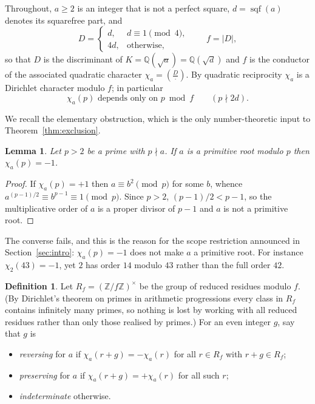 \documentclass[11pt,reqno]{amsart}
\theoremstyle{plain}
\newtheorem{lemma}[theorem]{Lemma}
\theoremstyle{definition}
\newtheorem{definition}[theorem]{Definition}
\DeclareMathOperator{\sqf}{sqf}
\newcommand{\Leg}[2]{\left(\frac{#1}{#2}\right)}
\newcommand{\Z}{\mathbb{Z}}
\newcommand{\Q}{\mathbb{Q}}
\begin{document}
Throughout, $a \ge 2$ is an integer that is not a perfect square, $d = \sqf(a)$
denotes its squarefree part, and
\begin{equation}
\label{eq:disc}
  D = \begin{cases} d, & d \equiv 1 \pmod 4,\\ 4d, & \text{otherwise,}\end{cases}
  \qquad f = |D|,
\end{equation}
so that $D$ is the discriminant of $K = \Q(\sqrt{a}) = \Q(\sqrt{d})$ and $f$ is
the conductor of the associated quadratic character
$\chi_a = \Leg{D}{\cdot}$. By quadratic reciprocity $\chi_a$ is a Dirichlet
character modulo $f$; in particular
\begin{equation}
\label{eq:modf}
  \chi_a(p) \text{ depends only on } p \bmod f \qquad (p \nmid 2d).
\end{equation}

We recall the elementary obstruction, which is the only number-theoretic input
to Theorem~\ref{thm:exclusion}.

\begin{lemma}
\label{lem:obstruction}
Let $p > 2$ be a prime with $p \nmid a$. If $a$ is a primitive root modulo $p$
then $\chi_a(p) = -1$.
\end{lemma}

\begin{proof}
If $\chi_a(p) = +1$ then $a \equiv b^2 \pmod p$ for some $b$, whence
$a^{(p-1)/2} \equiv b^{p-1} \equiv 1 \pmod p$. Since $p > 2$, $(p-1)/2 < p-1$,
so the multiplicative order of $a$ is a proper divisor of $p - 1$ and $a$ is not
a primitive root.
\end{proof}

The converse fails, and this is the reason for the scope restriction announced
in Section~\ref{sec:intro}: $\chi_a(p) = -1$ does not make $a$ a primitive
root. For instance $\chi_2(43) = -1$, yet $2$ has order $14$ modulo $43$ rather
than the full order $42$.

\begin{definition}
\label{def:shift}
Let $R_f = (\Z/f\Z)^\times$ be the group of reduced residues modulo $f$. (By
Dirichlet's theorem on primes in arithmetic progressions every class in $R_f$
contains infinitely many primes, so nothing is lost by working with all reduced
residues rather than only those realised by primes.) For an even integer $g$,
say that $g$ is
\begin{itemize}
\item \emph{reversing} for $a$ if $\chi_a(r+g) = -\chi_a(r)$ for all $r \in R_f$
      with $r + g \in R_f$;
\item \emph{preserving} for $a$ if $\chi_a(r+g) = +\chi_a(r)$ for all such $r$;
\item \emph{indeterminate} otherwise.
\end{itemize}
\end{definition}
\end{document}
